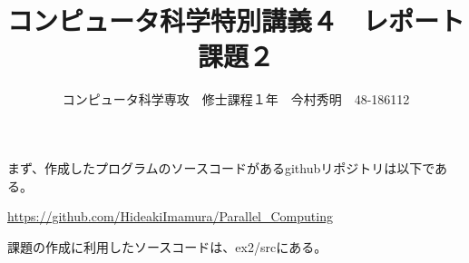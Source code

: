 \documentclass[11pt, oneside]{article}   	%
\title{コンピュータ科学特別講義４　レポート課題２}
\author{コンピュータ科学専攻　修士課程１年　今村秀明　48-186112}
\date{}							%
\begin{document}
\maketitle
まず、作成したプログラムのソースコードがあるgithubリポジトリは以下である。

\url{https://github.com/HideakiImamura/Parallel_Computing}

課題の作成に利用したソースコードは、ex2/srcにある。
\end{document}
